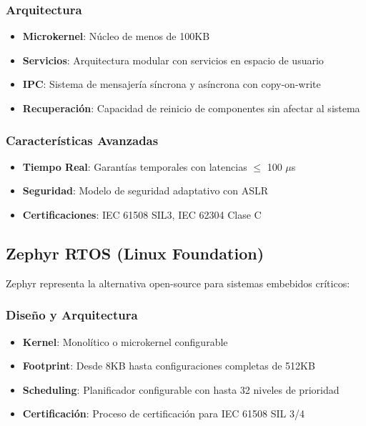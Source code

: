         \subsubsection{Arquitectura}
        \begin{itemize}
            \item \textbf{Microkernel}: Núcleo de menos de 100KB
            \item \textbf{Servicios}: Arquitectura modular con servicios en espacio de usuario
            \item \textbf{IPC}: Sistema de mensajería síncrona y asíncrona con copy-on-write
            \item \textbf{Recuperación}: Capacidad de reinicio de componentes sin afectar al sistema
        \end{itemize}

        \subsubsection{Características Avanzadas}
        \begin{itemize}
            \item \textbf{Tiempo Real}: Garantías temporales con latencias $\le$ 100 $\mu$s
            \item \textbf{Seguridad}: Modelo de seguridad adaptativo con ASLR
            \item \textbf{Certificaciones}: IEC 61508 SIL3, IEC 62304 Clase C
        \end{itemize}

    \newpage
    \subsection{Zephyr RTOS (Linux Foundation)}
    Zephyr representa la alternativa open-source para sistemas embebidos críticos:

        \subsubsection{Diseño y Arquitectura}
        \begin{itemize}
            \item \textbf{Kernel}: Monolítico o microkernel configurable
            \item \textbf{Footprint}: Desde 8KB hasta configuraciones completas de 512KB
            \item \textbf{Scheduling}: Planificador configurable con hasta 32 niveles de prioridad
            \item \textbf{Certificación}: Proceso de certificación para IEC 61508 SIL 3/4
        \end{itemize}

